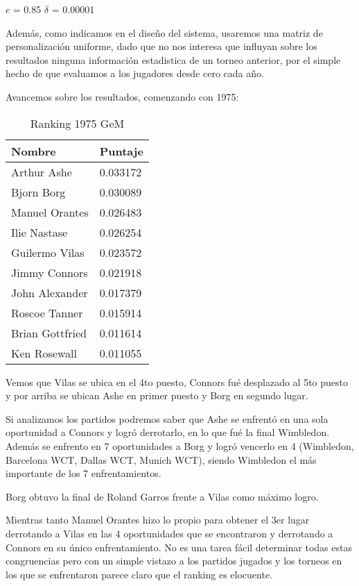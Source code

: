 $c$ = 0.85
$\delta$ = 0.00001

Además, como indicamos en el diseño del sistema, usaremos una matriz de personalización uniforme, dado que no nos interesa que influyan sobre los resultados ninguna información estadistica de un torneo anterior, por el simple hecho de que evaluamos a los jugadores desde cero cada año.

Avancemos sobre los resultados, comenzando con 1975:

\begin{table}[H]
\label{my-label}
\begin{tabular}{ll}
\hline
Nombre  & Puntaje \\ \hline
Arthur Ashe  & 0.033172 \\
Bjorn Borg  & 0.030089 \\
Manuel Orantes & 0.026483 \\
Ilie Nastase & 0.026254 \\
Guilermo Vilas & 0.023572 \\
Jimmy Connors & 0.021918 \\
John Alexander & 0.017379 \\
Roscoe Tanner & 0.015914 \\
Brian Gottfried & 0.011614 \\
Ken Rosewall & 0.011055 \\ \hline 
\end{tabular}
\centering
\caption{Ranking 1975 GeM}
\end{table}

Vemos que Vilas se ubica en el 4to puesto, Connors fué desplazado al 5to puesto y por arriba se ubican Ashe en primer puesto y Borg en segundo lugar. 

Si analizamos los partidos podremos saber que Ashe se enfrentó en una sola oportunidad a Connors y logró derrotarlo, en lo que fué la final Wimbledon. Además se enfrento en 7 oportunidades a Borg y logró vencerlo en 4 (Wimbledon, Barcelona WCT, Dallas WCT, Munich WCT), siendo Wimbledon el más importante de los 7 enfrentamientos.

Borg obtuvo la final de Roland Garros frente a Vilas como máximo logro. 

Mientras tanto Manuel Orantes hizo lo propio para obtener el 3er lugar derrotando a Vilas en las 4 oportunidades que se encontraron y derrotando a Connors en su único enfrentamiento. 
No es una tarea fácil determinar todas estas congruencias pero con un simple vistazo a los partidos jugados y los torneos en los que se enfrentaron parece claro que el ranking es elocuente.

